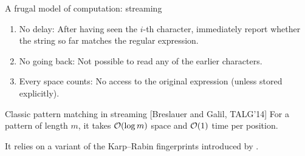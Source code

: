 \begin{frame}{A frugal model of computation: streaming}
\smallskip
\pause
\begin{enumerate}
\item No delay: After having seen the $i$-th character, immediately report whether the string so far matches the regular expression.
\pause
\item No going back: Not possible to read any of the earlier characters.
\pause
\item Every space counts: No access to the original expression (unless stored explicitly).
\end{enumerate}
\pause
\begin{mylemblock}{Classic pattern matching in streaming [Breslauer and Galil, TALG'14]}
    For a pattern of length $m$, it takes $\mathcal{O}(\log m)$ space and $\mathcal{O}(1)$ time per position.
\end{mylemblock}\pause
\begin{center}
    \small
    It relies on a variant of the Karp--Rabin fingerprints introduced by .
\end{center}
\end{frame}

